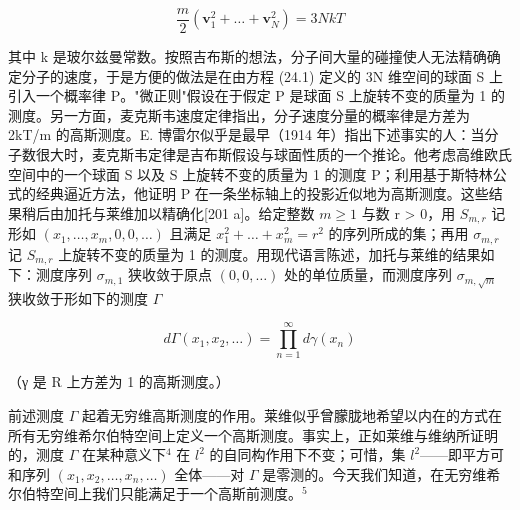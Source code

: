 \[
\frac {m}{2} (\mathbf {v} _ {1} ^ {2} + \dots + \mathbf {v} _ {N} ^ {2}) = 3 N k T\tag{24.1}
\]

其中 k 是玻尔兹曼常数。按照吉布斯的想法，分子间大量的碰撞使人无法精确确定分子的速度，于是方便的做法是在由方程 (24.1) 定义的 3N 维空间的球面 S 上引入一个概率律 P。"微正则"假设在于假定 P 是球面 S 上旋转不变的质量为 1 的测度。另一方面，麦克斯韦速度定律指出，分子速度分量的概率律是方差为 2kT/m 的高斯测度。E. 博雷尔似乎是最早（1914 年）指出下述事实的人：当分子数很大时，麦克斯韦定律是吉布斯假设与球面性质的一个推论。他考虑高维欧氏空间中的一个球面 S 以及 S 上旋转不变的质量为 1 的测度 P；利用基于斯特林公式的经典逼近方法，他证明 P 在一条坐标轴上的投影近似地为高斯测度。这些结果稍后由加托与莱维加以精确化{[}201 a{]}。给定整数 \(m \geq 1\) 与数 r > 0，用 \(S_{m,r}\) 记形如 \((x_{1}, \ldots, x_{m}, 0, 0, \ldots)\) 且满足 \(x_{1}^{2} + \ldots + x_{m}^{2} = r^{2}\) 的序列所成的集；再用 \(\sigma_{m,r}\) 记 \(S_{m,r}\) 上旋转不变的质量为 1 的测度。用现代语言陈述，加托与莱维的结果如下：测度序列 \(\sigma_{m,1}\) 狭收敛于原点 \((0, 0, \ldots)\) 处的单位质量，而测度序列 \(\sigma_{m,\sqrt{m}}\) 狭收敛于形如下的测度 \(\Gamma\)

\[
d \Gamma (x _ {1}, x _ {2}, \dots) = \prod_ {n = 1} ^ {\infty} d \gamma (x _ {n})
\]

（γ 是 R 上方差为 1 的高斯测度。）

前述测度 \(\Gamma\) 起着无穷维高斯测度的作用。莱维似乎曾朦胧地希望以内在的方式在所有无穷维希尔伯特空间上定义一个高斯测度。事实上，正如莱维与维纳所证明的，测度 \(\Gamma\) 在某种意义下\(^{4}\) 在 \(l^{2}\) 的自同构作用下不变；可惜，集 \(l^{2}\)——即平方可和序列 \((x_{1}, x_{2}, \ldots, x_{n}, \ldots)\) 全体——对 \(\Gamma\) 是零测的。今天我们知道，在无穷维希尔伯特空间上我们只能满足于一个高斯前测度。\(^{5}\)

